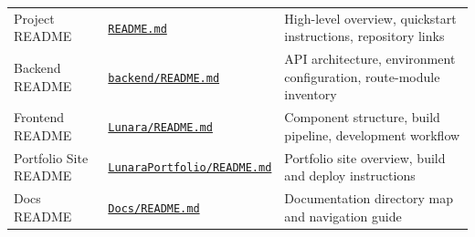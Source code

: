 \documentclass[12pt,letterpaper]{article}
\begin{document}
{\begin{longtable}{|>{\raggedright\arraybackslash}p{3.5cm}|>{\raggedright\arraybackslash}p{4.8cm}|>{\raggedright\arraybackslash}p{4.7cm}|}
\multicolumn{3}{|l|}{\cellcolor{LunaraBlue!10}\textbf{Repository READMEs}} \\
\hline
Project README & \href{\ghblob/README.md}{\texttt{README.md}} & High-level overview, quickstart instructions, repository links \\
\hline
\rowcolor{TableRowAlt}
Backend README & \href{\ghblob/backend/README.md}{\texttt{backend/README.md}} & API architecture, environment configuration, route-module inventory \\
\hline
Frontend README & \href{\ghblob/Lunara/README.md}{\texttt{Lunara/README.md}} & Component structure, build pipeline, development workflow \\
\hline
\rowcolor{TableRowAlt}
Portfolio Site README & \href{\ghblob/LunaraPortfolio/README.md}{\texttt{LunaraPortfolio/README.md}} & Portfolio site overview, build and deploy instructions \\
\hline
Docs README & \href{\ghblob/Docs/README.md}{\texttt{Docs/README.md}} & Documentation directory map and navigation guide \\
\hline


\end{longtable}}
\end{document}
